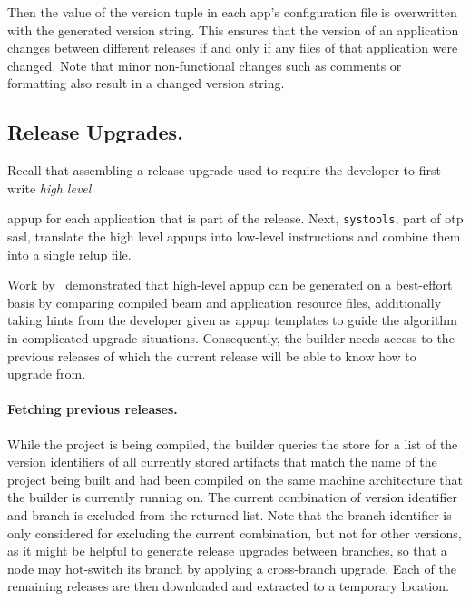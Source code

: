 Then the value of the version tuple in each app's configuration file is overwritten with the generated version string. This ensures that the version of an application changes between different releases if and only if any files of that application were changed. Note that minor non-functional changes such as comments or formatting also result in a changed version string.

\subsection{Release Upgrades.}

Recall that assembling a release upgrade used to require the developer to first write \emph{high level} {\acrfull{appup} for each application that is part of the release. Next, \lstinline|systools|, part of \acrshort{otp} \acrfull{sasl}, translate the high level appups into low-level instructions and combine them into a single \acrfull{relup} file.~\cite{doc:otp}

Work by~\cite{rebar3appup} demonstrated that high-level \acrlong{appup} can be generated on a best-effort basis by comparing compiled \acrshort{beam} and application resource files, additionally taking hints from the developer given as appup templates to guide the algorithm in complicated upgrade situations. Consequently, the builder needs access to the previous releases of which the current release will be able to know how to upgrade from.

\paragraph{Fetching previous releases.} While the project is being compiled, the builder queries the store for a list of the version identifiers of all currently stored artifacts that match the name of the project being built and had been compiled on the same machine architecture that the builder is currently running on. The current combination of version identifier and branch is excluded from the returned list. Note that the branch identifier is only considered for excluding the current combination, but not for other versions, as it might be helpful to generate release upgrades between branches, so that a node may hot-switch its branch by applying a cross-branch upgrade. Each of the remaining releases are then downloaded and extracted to a temporary location.

}
